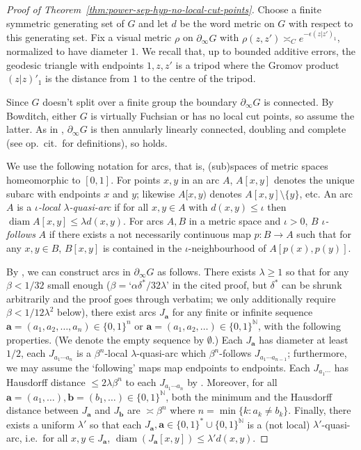 \documentclass[11pt]{amsart}
\numberwithin{equation}{section}
\theoremstyle{citing}
\DeclareMathOperator{\diam}{diam}
\newcommand{\bdry}{\partial_\infty}
\newcommand{\N}{\mathbb{N}}
\newcommand{\ba}{\mathbf{a}}
\newcommand{\bbb}{\mathbf{b}}
\numberwithin{equation}{section}
\begin{document}
\begin{proof}[Proof of Theorem~\ref{thm:power-sep-hyp-no-local-cut-points}]
	Choose a finite symmetric generating set of $G$ and let $d$ be the word metric on $G$ with respect to this generating set.
	Fix a visual metric $\rho$ on $\bdry G$ with $\rho(z,z') \asymp_C e^{-\epsilon (z|z')_1}$, normalized to have diameter $1$. We recall that, up to bounded additive errors, the geodesic triangle with endpoints $1,z,z'$ is a tripod where the Gromov product $(z|z)'_1$ is the distance from $1$ to the centre of the tripod.
    
	Since $G$ doesn't split over a finite group the boundary $\bdry G$ is connected.
	By Bowditch, either $G$ is virtually Fuchsian or has no local cut points, so assume the latter.
	As in \cite[Proof of Corollary 1.2]{Mac-10-confdim}, $\bdry G$ is then annularly linearly connected, doubling and complete (see op.\ cit.\ for definitions), so \cite[Theorem 1.4]{Mac-10-confdim} holds.  

	We use the following notation for arcs, that is, (sub)spaces of metric spaces homeomorphic to $[0,1]$.
	For points $x,y$ in an arc $A$, $A[x,y]$ denotes the unique subarc with endpoints $x$ and $y$; likewise $A[x,y)$ denotes $A[x,y] \setminus \{y\}$, etc.
	An arc $A$ is a \emph{$\iota$-local $\lambda$-quasi-arc} if for all $x,y \in A$ with $d(x,y) \leq \iota$ then $\diam A[x,y] \leq \lambda d(x,y)$.
	For arcs $A,B$ in a metric space and $\iota>0$, $B$ \emph{$\iota$-follows} $A$ if there exists a not necessarily continuous map $p:B \to A$ such that for any $x,y \in B$, $B[x,y]$ is contained in the $\iota$-neighbourhood of $A[p(x),p(y)]$.

	By \cite[Proof of Theorem 1.4]{Mac-10-confdim}, we can construct arcs  in $\bdry G$ as follows.
	There exists $\lambda \geq 1$ so that 
	for any $\beta< 1/32$ small enough ($\beta =$`$\alpha\delta^*/32\lambda$' in the cited proof, but $\delta^*$ can be shrunk arbitrarily and the proof goes through verbatim; we only additionally require $\beta < 1/12\lambda^2$ below),
	there exist 
	arcs $J_\ba$ for any finite or infinite sequence $\ba = (a_1,a_2,\ldots,a_n) \in \{0,1\}^n$ or $\ba= (a_1,a_2,\ldots) \in \{0,1\}^\N$, with the following properties.
	(We denote the empty sequence by $\emptyset$.)
	Each $J_{\ba}$ has diameter at least $1/2$, 
	each $J_{a_1\cdots a_n}$ is a $\beta^n$-local $\lambda$-quasi-arc which $\beta^n$-follows $J_{a_1\cdots a_{n-1}}$; 
	furthermore, we may assume the `following' maps map endpoints to endpoints.
	Each $J_{a_1\cdots}$ has Hausdorff distance $\leq 2\lambda\beta^n$ to each $J_{a_1\cdots a_n}$ by \cite[Lemma 4.1]{Mac-10-confdim}.
	Moreover, for all $\ba=(a_1,\ldots), \bbb=(b_1,\ldots) \in \{0,1\}^\N$, both the minimum and the Hausdorff distance between $J_\ba$ and $J_\bbb$ are $\asymp \beta^n$ where $n = \min\{k: a_k\neq b_k\}$.
	Finally, there exists a uniform $\lambda'$ so that each $J_{\ba}, \ba \in \{0,1\}^* \cup \{0,1\}^\N$ is a (not local) $\lambda'$-quasi-arc, i.e.\ for all $x,y\in J_{\ba}$, $\diam(J_{\ba}[x,y])\leq \lambda'd(x,y)$.


\end{proof}
\end{document}
